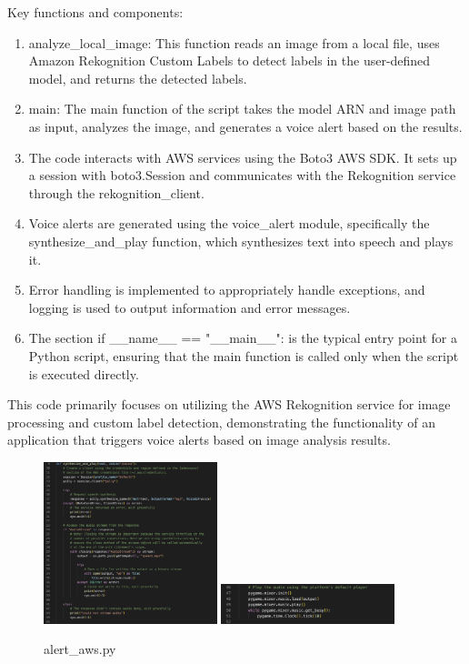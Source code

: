 Key functions and components:
\begin{enumerate}
    \item analyze\_local\_image: 
    This function reads an image from a local file, uses Amazon Rekognition Custom Labels to detect labels in the user-defined model, and returns the detected labels.\\
    \item main: 
    The main function of the script takes the model ARN and image path as input, analyzes the image, and generates a voice alert based on the results.\\
    \item The code interacts with AWS services using the Boto3 AWS SDK. It sets up a session with boto3.Session and communicates with the Rekognition service through the rekognition\_client.
    \item Voice alerts are generated using the voice\_alert module, specifically the synthesize\_and\_play function, which synthesizes text into speech and plays it.\\
    \item Error handling is implemented to appropriately handle exceptions, and logging is used to output information and error messages.\\
    \item The section if \_\_name\_\_ == "\_\_main\_\_": is the typical entry point for a Python script, ensuring that the main function is called only when the script is executed directly.\\
\end{enumerate}
This code primarily focuses on utilizing the AWS Rekognition service for image processing and custom label detection, demonstrating the functionality of an application that triggers voice alerts based on image analysis results.\\

\begin{figure}[h]
  \centering
  \includegraphics[width=0.45\textwidth]{images/voice_alert_1.png}
  \hspace{0.05\textwidth}
  \includegraphics[width=0.45\textwidth]{images/voice_alert_2.png}
  \caption{alert\_aws.py}
  \label{fig:twopics}
\end{figure}

